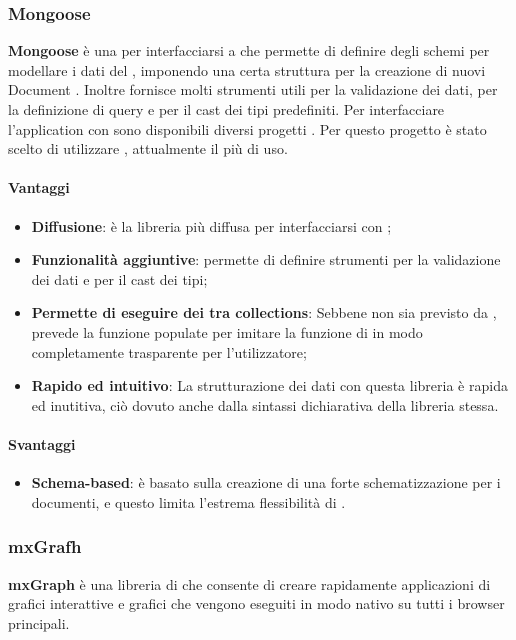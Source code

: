 	\subsubsection{Mongoose}
\textbf{Mongoose} è una  per interfacciarsi a  che permette di definire degli schemi per modellare i dati del , imponendo una certa struttura per la creazione di nuovi Document . Inoltre fornisce molti strumenti utili per la validazione dei dati, per la definizione di query e per il cast dei tipi predefiniti.
Per interfacciare l'application  con  sono disponibili diversi progetti . Per questo progetto è stato scelto di utilizzare  , attualmente il più di uso.

\paragraph{Vantaggi}
\begin{itemize}
\item \textbf{Diffusione}: è la libreria più diffusa per interfacciarsi con ;
\item \textbf{Funzionalità aggiuntive}: permette di definire strumenti per la validazione dei
dati e per il cast dei tipi;
\item \textbf{Permette di eseguire dei  tra collections}: Sebbene non sia previsto da
,  prevede la funzione populate per imitare la funzione di  in modo completamente trasparente per l’utilizzatore;
\item \textbf{Rapido ed intuitivo}: La strutturazione dei dati con questa libreria è rapida ed
inutitiva, ciò dovuto anche dalla sintassi dichiarativa della libreria stessa.
\end{itemize}

\paragraph{Svantaggi}
\begin{itemize}
\item \textbf{Schema-based}: è basato sulla creazione di una forte schematizzazione per i
documenti, e questo limita l’estrema flessibilità di .
\end{itemize}

	\subsubsection{mxGrafh}
	\textbf{mxGraph} è una libreria  di  che consente di creare rapidamente applicazioni di grafici interattive e grafici che vengono eseguiti in modo nativo su tutti i browser principali.

